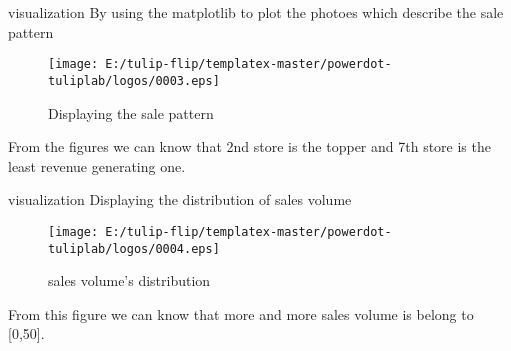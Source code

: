 \documentclass[
 size=12pt,
 paper=smartboard, %
 mode=present, %
 display=slides, %
style=tuliplab,
pauseslide,
fleqn,leqno]{powerdot}
\begin{document}
\begin{slide}[toc=,bm=]{visualization}
By using the matplotlib to plot the photoes which describe the sale pattern 
\begin{figure}[ht]%
  \centering%
  \texttt{[image: E:/tulip-flip/templatex-master/powerdot-tuliplab/logos/0003.eps]}
  \caption{Displaying the sale pattern}%
  \end{figure}
  \vspace{1cm}
  From the figures we can know that 2nd store is the topper and 7th store is the least revenue generating one.
\end{slide}

\begin{slide}[toc=,bm=]{visualization}
  Displaying the distribution of sales volume
  \begin{figure}[ht]%
    \centering%
    \texttt{[image: E:/tulip-flip/templatex-master/powerdot-tuliplab/logos/0004.eps]}
    \caption{sales volume's distribution}%
    \end{figure}
    \vspace{1cm}
    From this figure we can know that more and more sales volume is belong to [0,50].
  \end{slide}

\end{document}
